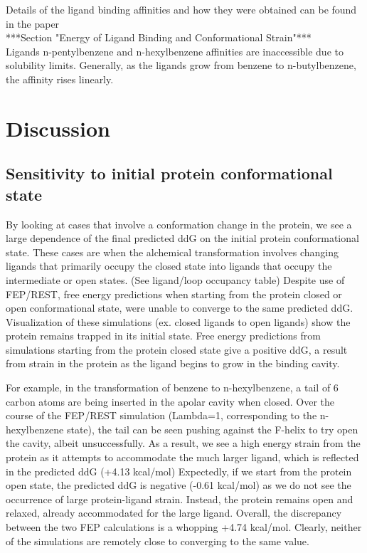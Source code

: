 \documentclass{article}
\begin{document}
Details of the ligand binding affinities and how they were obtained can be found in the paper \cite{Merski2015} \\
***Section "Energy of Ligand Binding and Conformational Strain"***\\
Ligands n-pentylbenzene and n-hexylbenzene affinities are inaccessible due to solubility limits.
Generally, as the ligands grow from benzene to n-butylbenzene, the affinity rises linearly.

\section{Discussion}
\subsection{Sensitivity to initial protein conformational state}
By looking at cases that involve a conformation change in the protein, we see a large dependence of the final predicted ddG on the initial protein conformational state.
These cases are when the alchemical transformation involves changing ligands that primarily occupy the closed state into ligands that occupy the intermediate or open states. (See ligand/loop occupancy table)
Despite use of FEP/REST, free energy predictions when starting from the protein closed or open conformational state, were unable to converge to the same predicted ddG.
Visualization of these simulations (ex. closed ligands to open ligands) show the protein remains trapped in its initial state.
Free energy predictions from simulations starting from the protein closed state give a positive ddG, a result from strain in the protein as the ligand begins to grow in the binding cavity.

For example, in the transformation of benzene to n-hexylbenzene, a tail of 6 carbon atoms are being inserted in the apolar cavity when closed.
Over the course of the FEP/REST simulation (Lambda=1, corresponding to the n-hexylbenzene state), the tail can be seen pushing against the F-helix to try open the cavity, albeit unsuccessfully.
As a result, we see a high energy strain from the protein as it attempts to accommodate the much larger ligand, which is reflected in the predicted ddG (+4.13 kcal/mol)
Expectedly, if we start from the protein open state, the predicted ddG is negative (-0.61 kcal/mol) as we do not see the occurrence of large protein-ligand strain.
Instead, the protein remains open and relaxed, already accommodated for the large ligand.
Overall, the discrepancy between the two FEP calculations is a whopping +4.74 kcal/mol.
Clearly, neither of the simulations are remotely close to converging to the same value. 
\end{document}
